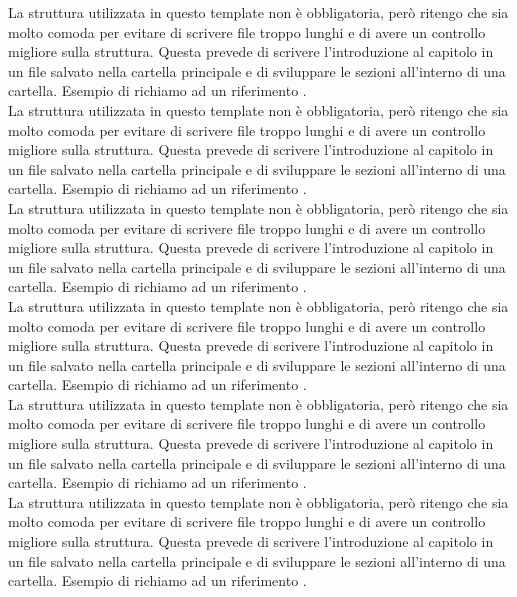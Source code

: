 \noindent
La struttura utilizzata in questo template non è obbligatoria, però ritengo che sia molto comoda per evitare di scrivere file troppo lunghi e di avere un controllo migliore sulla struttura. Questa prevede di scrivere l'introduzione al capitolo in un file salvato nella cartella principale e di sviluppare le sezioni all'interno di una cartella. Esempio di richiamo ad un riferimento \cite{Latex-impara-latex}.\\

\noindent
La struttura utilizzata in questo template non è obbligatoria, però ritengo che sia molto comoda per evitare di scrivere file troppo lunghi e di avere un controllo migliore sulla struttura. Questa prevede di scrivere l'introduzione al capitolo in un file salvato nella cartella principale e di sviluppare le sezioni all'interno di una cartella. Esempio di richiamo ad un riferimento \cite{Latex-impara-latex}.\\

\noindent
La struttura utilizzata in questo template non è obbligatoria, però ritengo che sia molto comoda per evitare di scrivere file troppo lunghi e di avere un controllo migliore sulla struttura. Questa prevede di scrivere l'introduzione al capitolo in un file salvato nella cartella principale e di sviluppare le sezioni all'interno di una cartella. Esempio di richiamo ad un riferimento \cite{Latex-impara-latex}.\\

\noindent
La struttura utilizzata in questo template non è obbligatoria, però ritengo che sia molto comoda per evitare di scrivere file troppo lunghi e di avere un controllo migliore sulla struttura. Questa prevede di scrivere l'introduzione al capitolo in un file salvato nella cartella principale e di sviluppare le sezioni all'interno di una cartella. Esempio di richiamo ad un riferimento \cite{Latex-impara-latex}.\\

\noindent
La struttura utilizzata in questo template non è obbligatoria, però ritengo che sia molto comoda per evitare di scrivere file troppo lunghi e di avere un controllo migliore sulla struttura. Questa prevede di scrivere l'introduzione al capitolo in un file salvato nella cartella principale e di sviluppare le sezioni all'interno di una cartella. Esempio di richiamo ad un riferimento \cite{Latex-impara-latex}.\\

\noindent
La struttura utilizzata in questo template non è obbligatoria, però ritengo che sia molto comoda per evitare di scrivere file troppo lunghi e di avere un controllo migliore sulla struttura. Questa prevede di scrivere l'introduzione al capitolo in un file salvato nella cartella principale e di sviluppare le sezioni all'interno di una cartella. Esempio di richiamo ad un riferimento \cite{Latex-impara-latex}.\\


